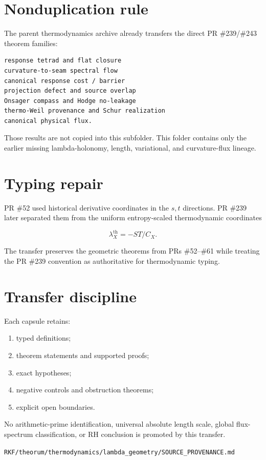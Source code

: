 \hypertarget{nonduplication-rule}{%
\section{Nonduplication rule}\label{nonduplication-rule}}

The parent thermodynamics archive already transfers the direct PR \#239/\#243 theorem families:

\begin{verbatim}
response tetrad and flat closure
curvature-to-seam spectral flow
canonical response cost / barrier
projection defect and source overlap
Onsager compass and Hodge no-leakage
thermo-Weil provenance and Schur realization
canonical physical flux.
\end{verbatim}

Those results are not copied into this subfolder. This folder contains only the earlier missing lambda-holonomy, length, variational, and curvature-flux lineage.

\hypertarget{typing-repair}{%
\section{Typing repair}\label{typing-repair}}

PR \#52 used historical derivative coordinates in the \(s,t\) directions. PR \#239 later separated them from the uniform entropy-scaled thermodynamic coordinates

\[
\lambda_X^{\mathrm{th}}=-ST/C_X.
\]

The transfer preserves the geometric theorems from PRs \#52--\#61 while treating the PR \#239 convention as authoritative for thermodynamic typing.

\hypertarget{transfer-discipline}{%
\section{Transfer discipline}\label{transfer-discipline}}

Each capsule retains:

\begin{enumerate}
\def\labelenumi{\arabic{enumi}.}
\tightlist
\item
  typed definitions;
\item
  theorem statements and supported proofs;
\item
  exact hypotheses;
\item
  negative controls and obstruction theorems;
\item
  explicit open boundaries.
\end{enumerate}

No arithmetic-prime identification, universal absolute length scale, global flux-spectrum classification, or RH conclusion is promoted by this transfer.

\begin{flushright}\small\texttt{RKF/theorum/thermodynamics/lambda\_geometry/SOURCE\_PROVENANCE.md}\end{flushright}
